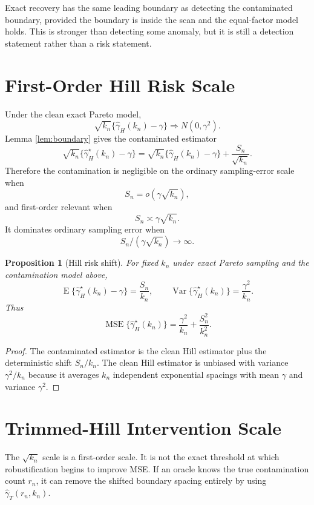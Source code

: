 \documentclass[11pt]{article}
\newtheorem{proposition}{Proposition}
\DeclareMathOperator{\Var}{Var}
\DeclareMathOperator{\E}{E}
\newcommand{\ghat}{\widehat{\gamma}}
\begin{document}
Exact recovery has the same leading boundary as detecting the contaminated
boundary, provided the boundary is inside the scan and the equal-factor model
holds.  This is stronger than detecting some anomaly, but it is still a
detection statement rather than a risk statement.

\section{First-Order Hill Risk Scale}

Under the clean exact Pareto model,
\[
  \sqrt{k_n}\{\ghat_H(k_n)-\gamma\}
  \Rightarrow
  N(0,\gamma^2).
\]
Lemma \ref{lem:boundary} gives the contaminated estimator
\[
  \sqrt{k_n}\{\ghat^\star_H(k_n)-\gamma\}
  =
  \sqrt{k_n}\{\ghat_H(k_n)-\gamma\}
  +
  \frac{S_n}{\sqrt{k_n}}.
\]
Therefore the contamination is negligible on the ordinary sampling-error scale
when
\[
  S_n=o(\gamma\sqrt{k_n}),
\]
and first-order relevant when
\[
  S_n\asymp\gamma\sqrt{k_n}.
\]
It dominates ordinary sampling error when
\[
  S_n/(\gamma\sqrt{k_n})\to\infty.
\]

\begin{proposition}[Hill risk shift]
\label{prop:risk}
For fixed $k_n$ under exact Pareto sampling and the contamination model above,
\[
  \E\{\ghat^\star_H(k_n)-\gamma\}=\frac{S_n}{k_n},
  \qquad
  \Var\{\ghat^\star_H(k_n)\}=\frac{\gamma^2}{k_n}.
\]
Thus
\[
  \operatorname{MSE}\{\ghat^\star_H(k_n)\}
  =
  \frac{\gamma^2}{k_n}
  +
  \frac{S_n^2}{k_n^2}.
\]
\end{proposition}

\begin{proof}
The contaminated estimator is the clean Hill estimator plus the deterministic
shift $S_n/k_n$.  The clean Hill estimator is unbiased with variance
$\gamma^2/k_n$ because it averages $k_n$ independent exponential spacings with
mean $\gamma$ and variance $\gamma^2$.
\end{proof}

\section{Trimmed-Hill Intervention Scale}
\label{sec:oracle-scale}

The $\sqrt{k_n}$ scale is a first-order scale.  It is not the exact threshold
at which robustification begins to improve MSE.  If an oracle knows the true
contamination count $r_n$, it can remove the shifted boundary spacing entirely
by using $\ghat_T(r_n,k_n)$.
\end{document}
